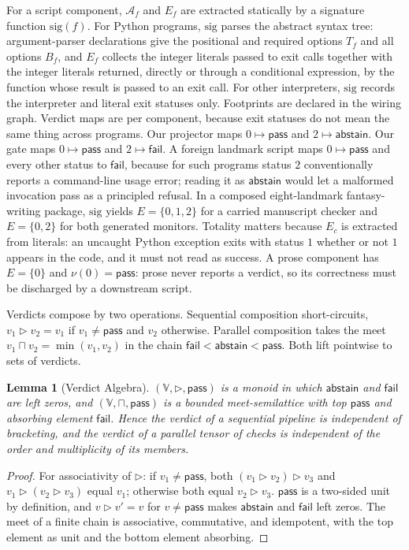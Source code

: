 \documentclass[11pt]{article}
\theoremstyle{definition}
\theoremstyle{plain}
\newtheorem{lemma}{Lemma}
\newcommand{\Acal}{\mathcal{A}}
\newcommand{\pass}{\mathsf{pass}}
\newcommand{\abst}{\mathsf{abstain}}
\newcommand{\fail}{\mathsf{fail}}
\newcommand{\Vset}{\mathbb{V}}
\newcommand{\vseq}{\mathbin{\triangleright}}
\newcommand{\vpar}{\mathbin{\sqcap}}
\newcommand{\sig}{\mathrm{sig}}
\begin{document}
For a script component, $\Acal_f$ and $E_f$ are extracted statically by a signature function $\sig(f)$. For Python programs, $\sig$ parses the abstract syntax tree: argument-parser declarations give the positional and required options $T_f$ and all options $B_f$, and $E_f$ collects the integer literals passed to exit calls together with the integer literals returned, directly or through a conditional expression, by the function whose result is passed to an exit call. For other interpreters, $\sig$ records the interpreter and literal exit statuses only. Footprints are declared in the wiring graph. Verdict maps are per component, because exit statuses do not mean the same thing across programs. Our projector maps $0 \mapsto \pass$ and $2 \mapsto \abst$. Our gate maps $0 \mapsto \pass$ and $2 \mapsto \fail$. A foreign landmark script maps $0 \mapsto \pass$ and every other status to $\fail$, because for such programs status $2$ conventionally reports a command-line usage error; reading it as $\abst$ would let a malformed invocation pass as a principled refusal. In a composed eight-landmark fantasy-writing package, $\sig$ yields $E = \{0, 1, 2\}$ for a carried manuscript checker and $E = \{0, 2\}$ for both generated monitors. Totality matters because $E_c$ is extracted from literals: an uncaught Python exception exits with status $1$ whether or not $1$ appears in the code, and it must not read as success. A prose component has $E = \{0\}$ and $\nu(0) = \pass$: prose never reports a verdict, so its correctness must be discharged by a downstream script.

Verdicts compose by two operations. Sequential composition short-circuits, $v_1 \vseq v_2 = v_1$ if $v_1 \neq \pass$ and $v_2$ otherwise. Parallel composition takes the meet $v_1 \vpar v_2 = \min(v_1, v_2)$ in the chain $\fail < \abst < \pass$. Both lift pointwise to sets of verdicts.

\begin{lemma}[Verdict Algebra]
\label{lem:verdict}
$(\Vset, \vseq, \pass)$ is a monoid in which $\abst$ and $\fail$ are left zeros, and $(\Vset, \vpar, \pass)$ is a bounded meet-semilattice with top $\pass$ and absorbing element $\fail$. Hence the verdict of a sequential pipeline is independent of bracketing, and the verdict of a parallel tensor of checks is independent of the order and multiplicity of its members.
\end{lemma}

\begin{proof}
For associativity of $\vseq$: if $v_1 \neq \pass$, both $(v_1 \vseq v_2) \vseq v_3$ and $v_1 \vseq (v_2 \vseq v_3)$ equal $v_1$; otherwise both equal $v_2 \vseq v_3$. $\pass$ is a two-sided unit by definition, and $v \vseq v' = v$ for $v \neq \pass$ makes $\abst$ and $\fail$ left zeros. The meet of a finite chain is associative, commutative, and idempotent, with the top element as unit and the bottom element absorbing.
\end{proof}
\end{document}
